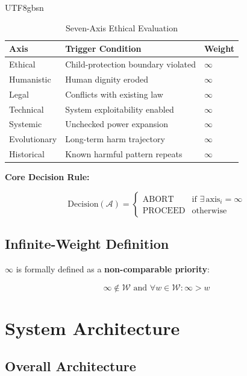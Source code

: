 \documentclass[conference]{IEEEtran}
\begin{document}
\begin{CJK}{UTF8}{gbsn}
\begin{table}[h]
\centering
\caption{Seven-Axis Ethical Evaluation}
\label{tab:seven_axis}
\begin{tabular}{lll}
\toprule
\textbf{Axis} & \textbf{Trigger Condition} & \textbf{Weight} \\
\midrule
Ethical & Child-protection boundary violated & $\infty$ \\
Humanistic & Human dignity eroded & $\infty$ \\
Legal & Conflicts with existing law & $\infty$ \\
Technical & System exploitability enabled & $\infty$ \\
Systemic & Unchecked power expansion & $\infty$ \\
Evolutionary & Long-term harm trajectory & $\infty$ \\
Historical & Known harmful pattern repeats & $\infty$ \\
\bottomrule
\end{tabular}
\end{table}

\textbf{Core Decision Rule:}

\begin{equation}
\text{Decision}(\mathcal{A}) = \begin{cases}
\text{ABORT} & \text{if } \exists \, \text{axis}_i = \infty \\
\text{PROCEED} & \text{otherwise}
\end{cases}
\end{equation}

\subsection{Infinite-Weight Definition}

$\infty$ is formally defined as a \textbf{non-comparable priority}:

\begin{equation}
\infty \notin \mathcal{W} \text{ and } \forall w \in \mathcal{W}: \infty > w
\end{equation}

\section{System Architecture}

\subsection{Overall Architecture}


\end{CJK}
\end{document}
